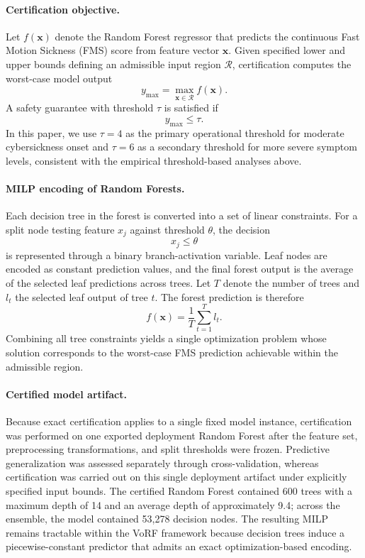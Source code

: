 \documentclass[review]{vgtc}              %
\begin{document}
\paragraph{Certification objective.}
Let $f(\mathbf{x})$ denote the Random Forest regressor that predicts the continuous Fast Motion Sickness (FMS) score from feature vector $\mathbf{x}$. Given specified lower and upper bounds defining an admissible input region $\mathcal{R}$, certification computes the worst-case model output
\begin{equation}
y_{\max} = \max_{\mathbf{x}\in\mathcal{R}} f(\mathbf{x}).
\end{equation}
A safety guarantee with threshold $\tau$ is satisfied if
\begin{equation}
y_{\max} \le \tau.
\end{equation}
In this paper, we use $\tau = 4$ as the primary operational threshold for moderate cybersickness onset and $\tau = 6$ as a secondary threshold for more severe symptom levels, consistent with the empirical threshold-based analyses above.

\paragraph{MILP encoding of Random Forests.}
Each decision tree in the forest is converted into a set of linear constraints. For a split node testing feature $x_j$ against threshold $\theta$, the decision
\begin{equation}
x_j \le \theta
\end{equation}
is represented through a binary branch-activation variable. Leaf nodes are encoded as constant prediction values, and the final forest output is the average of the selected leaf predictions across trees. Let $T$ denote the number of trees and $l_t$ the selected leaf output of tree $t$. The forest prediction is therefore
\begin{equation}
f(\mathbf{x}) = \frac{1}{T}\sum_{t=1}^{T} l_t.
\end{equation}
Combining all tree constraints yields a single optimization problem whose solution corresponds to the worst-case FMS prediction achievable within the admissible region.

\paragraph{Certified model artifact.}
Because exact certification applies to a single fixed model instance, certification was performed on one exported deployment Random Forest after the feature set, preprocessing transformations, and split thresholds were frozen. Predictive generalization was assessed separately through cross-validation, whereas certification was carried out on this single deployment artifact under explicitly specified input bounds. The certified Random Forest contained 600 trees with a maximum depth of 14 and an average depth of approximately 9.4; across the ensemble, the model contained 53{,}278 decision nodes. The resulting MILP remains tractable within the VoRF framework because decision trees induce a piecewise-constant predictor that admits an exact optimization-based encoding.
\end{document}
